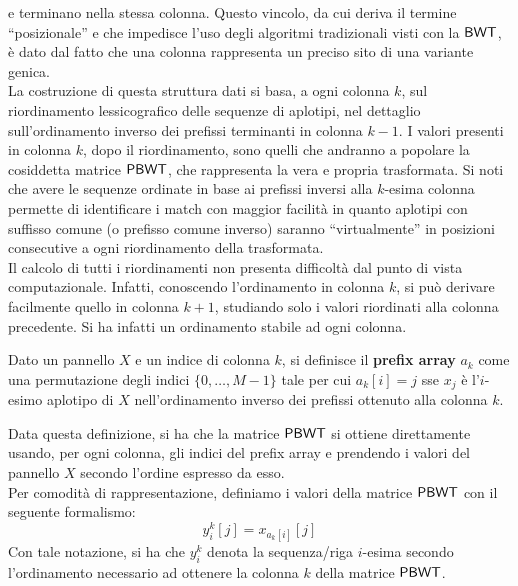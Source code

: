 e terminano nella stessa colonna. Questo vincolo,
da cui deriva il termine ``posizionale'' e che impedisce l'uso degli
algoritmi tradizionali visti con la $\mbox{\rm {\sf BWT}}$, è dato dal fatto che una
colonna rappresenta un preciso sito di una variante genica. \\
La costruzione di questa struttura dati si basa, a ogni colonna $k$, sul
riordinamento lessicografico delle sequenze di aplotipi, nel dettaglio
sull'ordinamento 
inverso dei prefissi terminanti in colonna $k-1$. I valori presenti in colonna
$k$, dopo il riordinamento, sono quelli che andranno a popolare
la cosiddetta matrice $\mbox{\rm {\sf PBWT}}$, che rappresenta la vera e propria
trasformata. Si noti che avere le sequenze 
ordinate in base ai prefissi inversi alla $k$-esima colonna permette di
identificare i match con maggior facilità in quanto aplotipi
con suffisso comune (o prefisso comune inverso) saranno ``virtualmente'' in
posizioni 
consecutive a ogni riordinamento della trasformata.\\
Il calcolo di tutti i riordinamenti non presenta difficoltà dal punto di
vista computazionale. Infatti, conoscendo l'ordinamento in colonna $k$, si può
derivare facilmente quello in colonna $k+1$, studiando solo i valori
riordinati alla colonna precedente. Si ha infatti un ordinamento stabile ad ogni
colonna. 
\begin{definizione}
  Dato un pannello $X$ e un indice di colonna
  $k$, si definisce il \textbf{prefix array} $a_k$ come una permutazione degli
  indici $\{0,\ldots, M-1\}$ tale per cui $a_k[i]=j$ sse $x_j$ è l'$i$-esimo
  aplotipo di 
  $X$ nell'ordinamento inverso dei prefissi ottenuto alla colonna $k$.
\end{definizione}
Data questa definizione, si ha che la matrice $\mbox{\rm {\sf PBWT}}$ si ottiene
direttamente usando, per ogni colonna, gli indici del prefix
  array e prendendo i valori del pannello $X$ secondo l'ordine espresso da
esso.\\ 
Per comodità di rappresentazione, definiamo i valori della
matrice $\mbox{\rm {\sf PBWT}}$ con il seguente formalismo:
\begin{equation}
  \label{eq:pbwty}
  y_i^k[j]=x_{a_k[i]}[j]
\end{equation}
Con tale notazione, si ha che $y_i^k$ denota la sequenza/riga $i$-esima secondo
l'ordinamento necessario ad ottenere la colonna $k$ della matrice $\mbox{\rm {\sf PBWT}}$. \\
